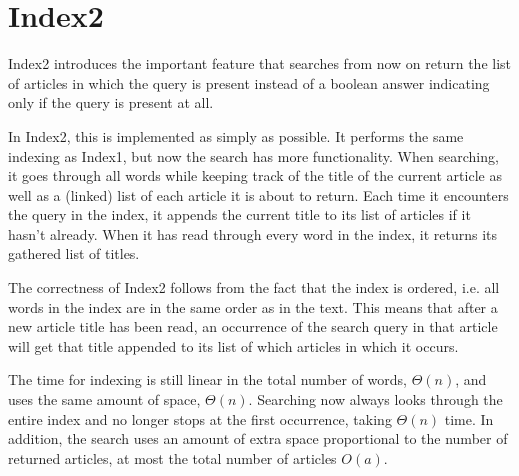 \section{Index2}
\label{section:Index2}

Index2 introduces the important feature that searches from now on return the list of articles in which the query is present instead of a boolean answer indicating only if the query is present at all. 

In Index2, this is implemented as simply as possible. It performs the same indexing as Index1, but now the search has more functionality. When searching, it goes through all words while keeping track of the title of the current article as well as a (linked) list of each article it is about to return. Each time it encounters the query in the index, it appends the current title to its list of articles if it hasn't already. When it has read through every word in the index, it returns its gathered list of titles. 

The correctness of Index2 follows from the fact that the index is ordered, i.e. all words in the index are in the same order as in the text. This means that after a new article title has been read, an occurrence of the search query in that article will get that title appended to its list of which articles in which it occurs. 

The time for indexing is still linear in the total number of words, $\Theta(n)$, and uses the same amount of space, $\Theta(n)$. Searching now always looks through the entire index and no longer stops at the first occurrence, taking $\Theta(n)$ time. In addition, the search uses an amount of extra space proportional to the number of returned articles, at most the total number of articles $O(a)$. 

